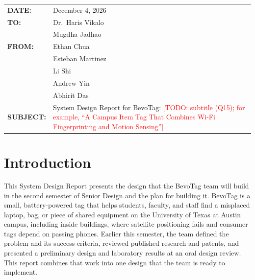 \documentclass[12pt,letterpaper]{article}
\newcommand{\TODO}[1]{\textcolor{red}{[TODO: #1]}}
\begin{document}
\thispagestyle{empty}

\begingroup
{}
\newcommand{\fieldgap}{\\[6.2pt]}
\noindent\begin{tabular}{@{}p{1.1in}@{}p{\dimexpr\linewidth-1.1in\relax}@{}}
\textbf{DATE:} & December 4, 2026 \fieldgap
\textbf{TO:} & Dr.\ Haris Vikalo \\ & Mugdha Jadhao \fieldgap
\textbf{FROM:} & Ethan Chua \\ & Esteban Martinez \\ & Li Shi \\ & Andrew Yin \\ & Abhirit Das \fieldgap
\textbf{SUBJECT:} & System Design Report for BevoTag: \TODO{subtitle (Q15); for example, ``A Campus Item
Tag That Combines Wi-Fi Fingerprinting and Motion Sensing''} \\
\end{tabular}
\endgroup

\section{Introduction}\label{sec:intro}
This System Design Report presents the design that the BevoTag team will build in the second
semester of Senior Design and the plan for building it. BevoTag is a small, battery-powered tag that
helps students, faculty, and staff find a misplaced laptop, bag, or piece of shared equipment on the
University of Texas at Austin campus, including inside buildings, where satellite positioning fails
and consumer tags depend on passing phones. Earlier this semester, the team defined the problem and
its success criteria, reviewed published research and patents, and presented a preliminary design
and laboratory results at an oral design review. This report combines that work into one design
that the team is ready to implement.
\end{document}
